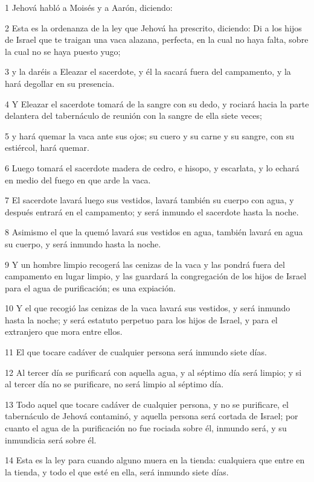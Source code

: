 \par 1 Jehová habló a Moisés y a Aarón, diciendo:
\par 2 Esta es la ordenanza de la ley que Jehová ha prescrito, diciendo: Di a los hijos de Israel que te traigan una vaca alazana, perfecta, en la cual no haya falta, sobre la cual no se haya puesto yugo;
\par 3 y la daréis a Eleazar el sacerdote, y él la sacará fuera del campamento, y la hará degollar en su presencia.
\par 4 Y Eleazar el sacerdote tomará de la sangre con su dedo, y rociará hacia la parte delantera del tabernáculo de reunión con la sangre de ella siete veces;
\par 5 y hará quemar la vaca ante sus ojos; su cuero y su carne y su sangre, con su estiércol, hará quemar.
\par 6 Luego tomará el sacerdote madera de cedro, e hisopo, y escarlata, y lo echará en medio del fuego en que arde la vaca.
\par 7 El sacerdote lavará luego sus vestidos, lavará también su cuerpo con agua, y después entrará en el campamento; y será inmundo el sacerdote hasta la noche.
\par 8 Asimismo el que la quemó lavará sus vestidos en agua, también lavará en agua su cuerpo, y será inmundo hasta la noche.
\par 9 Y un hombre limpio recogerá las cenizas de la vaca y las pondrá fuera del campamento en lugar limpio, y las guardará la congregación de los hijos de Israel para el agua de purificación; es una expiación.
\par 10 Y el que recogió las cenizas de la vaca lavará sus vestidos, y será inmundo hasta la noche; y será estatuto perpetuo para los hijos de Israel, y para el extranjero que mora entre ellos.
\par 11 El que tocare cadáver de cualquier persona será inmundo siete días.
\par 12 Al tercer día se purificará con aquella agua, y al séptimo día será limpio; y si al tercer día no se purificare, no será limpio al séptimo día.
\par 13 Todo aquel que tocare cadáver de cualquier persona, y no se purificare, el tabernáculo de Jehová contaminó, y aquella persona será cortada de Israel; por cuanto el agua de la purificación no fue rociada sobre él, inmundo será, y su inmundicia será sobre él.
\par 14 Esta es la ley para cuando alguno muera en la tienda: cualquiera que entre en la tienda, y todo el que esté en ella, será inmundo siete días.
